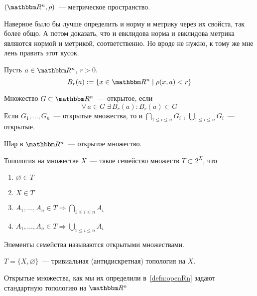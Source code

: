 \documentclass[12pt]{../../notes}
\begin{document}
\begin{defn}\label{defn:metrspace}
  $(\R^n, \rho)$~--- метрическое пространство.
\end{defn}

\begin{rem*}
  Наверное было бы лучше определить и норму и метрику через их свойста, так более общо. 
  А потом доказать, что и евклидова норма и евклидова метрика являются нормой и метрикой, соответственно.
  Но вроде не нужно, к тому же мне лень править этот кусок.
\end{rem*}

\begin{defn}[Шар в $\R^n$]\label{defn:ballRn}
  Пусть $a\in \R^n$, $r > 0$.
  \[
    B_r(a) := \{ x\in \R^n \mid \rho(x,a) < r \}
  \]
\end{defn}

\begin{defn}\label{defn:openRn}
  Множество $G \subset \R^n$~--- открытое, если 
  \[
    \forall\, a \in G \; \exists\, B_r(a) \colon B_r(a) \subset G
  \]
  Если $G_1, \dotsc, G_n$~--- открытые множества, то и $\bigcap\limits_{1\leqslant i \leqslant n} G_i$ ,
  $\bigcup\limits_{1\leqslant i \leqslant n} G_i$~--- открытые.
\end{defn}

\begin{exmp*}
  Шар в $\R^n$~--- открытое множество.
\end{exmp*}

\begin{defn}\label{defn:topology}
  Топология на множестве $X$~--- такое семейство множеств $T \subset 2^X$, что 
  \begin{enumerate}
    \item $\varnothing \in T$
    \item $X \in T$
    \item $A_1, \dotsc, A_n \in T \Rightarrow \bigcap\limits_{1\leqslant i \leqslant n} A_i$
    \item $A_1, \dotsc, A_n \in T \Rightarrow \bigcup\limits_{1\leqslant i \leqslant n} A_i$
  \end{enumerate}
  Элементы семейства называются открытыми множествами.
\end{defn}

\begin{exmp}
  $T = \{ X, \varnothing \}$~--- тривиальная (антидискретная) топология на $X$.
\end{exmp}

\begin{exmp}
  Открытые множества, как мы их определили в~\ref{defn:openRn} задают стандартную топологию на $\R^n$
\end{exmp}
\end{document}
